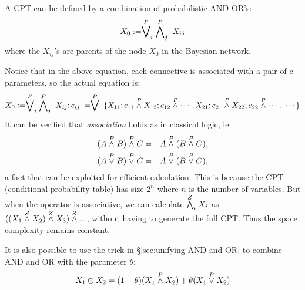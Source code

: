 A CPT can be defined by a combination of probabilistic AND-OR's:
\begin{equation}
X_0 := \stackrel{P}{\bigvee}_i \; \stackrel{P}{\bigwedge}_j \; X_{ij}
\end{equation}
where the $X_{ij}$'s are parents of the node $X_0$ in the Bayesian network.

Notice that in the above equation, each connective is associated with a pair of c parameters, so the actual equation is:
\begin{equation}
X_0 := \stackrel{P}{\bigvee}_i \; \stackrel{P}{\bigwedge}_j \; X_{ij};c_{ij} \; = \stackrel{P}{\bigvee} \; \{ X_{11};c_{11} \stackrel{P}{\wedge} X_{12};c_{12} \stackrel{P}{\wedge} \cdots, X_{21};c_{21} \stackrel{P}{\wedge} X_{22};c_{22} \stackrel{P}{\wedge} \cdots, \; \cdots \}
\end{equation}
It can be verified that \emph{association} holds as in classical logic, ie:
\begin{eqnarray}
(A \stackrel{P}{\wedge} B) \stackrel{P}{\wedge} C & = & A \stackrel{P}{\wedge} (B \stackrel{P}{\wedge} C), \\
(A \stackrel{P}{\vee}   B) \stackrel{P}{\vee}   C & = & A \stackrel{P}{\vee}   (B \stackrel{P}{\vee}   C),
\end{eqnarray}
a fact that can be exploited for efficient calculation.  This is because the CPT (conditional probability table) has size $2^n$ where $n$ is the number of variables.  But when the operator is associative, we can calculate $\stackrel{Z}{\bigwedge}_i X_i$ as $((X_1 \stackrel{Z}{\wedge} X_2) \stackrel{Z}{\wedge} X_3) \stackrel{Z}{\wedge} ...$, without having to generate the full CPT.  Thus the space complexity remains constant.

It is also possible to use the trick in \S\ref{sec:unifying-AND-and-OR} to combine AND and OR with the parameter $\theta$:
\begin{equation}
X_1 \varodot X_2 = (1-\theta) (X_1 \stackrel{P}{\wedge} X_2) + \theta (X_1 \stackrel{P}{\vee} X_2)
\end{equation}

